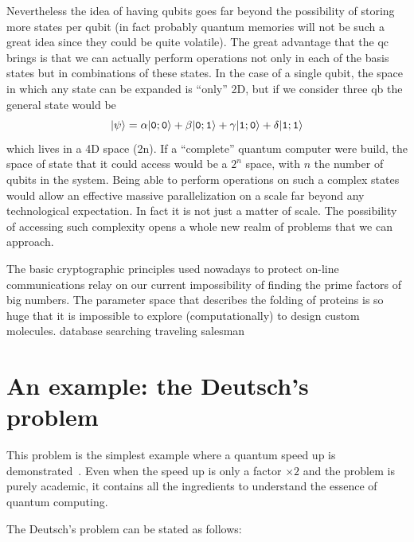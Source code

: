 Nevertheless the idea of having qubits goes far beyond the possibility of storing more states per qubit (in fact probably quantum memories will not be such a great idea since they could be quite volatile).
The great advantage that the \ac{qc} brings is that we can actually perform operations not only in each of the basis states but in combinations of these states\cite{DiVincenzo2000}. In the case of a single qubit, the space in which any state can be expanded is ``only'' 2D, but if we consider three \ac{qb} the general state would be
\begin{equation}
  |\psi\rangle = \alpha|\texttt{0};\texttt{0}\rangle + \beta|\texttt{0};\texttt{1}\rangle +
               \gamma|\texttt{1};\texttt{0}\rangle + \delta|\texttt{1};\texttt{1}\rangle
\end{equation}
which lives in a 4D space (2n).
If a ``complete'' quantum computer were build, the space of state that it could access would be a $2^n$ space, with $n$ the number of qubits in the system. Being able to perform operations on such a complex states would allow an effective massive parallelization on a scale far beyond any technological expectation.
In fact it is not just a matter of scale. The possibility of accessing such complexity opens a whole new realm of problems that we can approach.

The basic cryptographic principles used nowadays to protect on-line communications relay on our current impossibility of finding the prime factors of big numbers\cite{Shor1994}.
The parameter space that describes the folding of proteins is so huge that it is impossible to explore (computationally) to design custom molecules.\cite{Lanyon2009}
database searching\cite{Grover1997}
traveling salesman\cite{Goswami2004, Moylett2017}




\section{An example: the Deutsch's problem}
This problem is the simplest example where a quantum speed up is demonstrated~\cite{Deutsch1992}. Even when the speed up is only a factor $\times2$ and the problem is purely academic, it contains all the ingredients to understand the essence of quantum computing.

The Deutsch's problem can be stated as follows:

